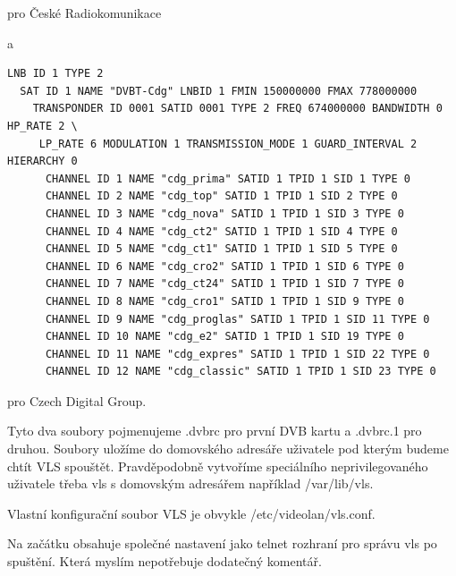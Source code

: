 \vspace{10pt}

pro České Radiokomunikace 

\vspace{10pt}

a

\vspace{10pt}

\begin{small}
\begin{verbatim}
LNB ID 1 TYPE 2
  SAT ID 1 NAME "DVBT-Cdg" LNBID 1 FMIN 150000000 FMAX 778000000
    TRANSPONDER ID 0001 SATID 0001 TYPE 2 FREQ 674000000 BANDWIDTH 0 HP_RATE 2 \
     LP_RATE 6 MODULATION 1 TRANSMISSION_MODE 1 GUARD_INTERVAL 2 HIERARCHY 0
      CHANNEL ID 1 NAME "cdg_prima" SATID 1 TPID 1 SID 1 TYPE 0
      CHANNEL ID 2 NAME "cdg_top" SATID 1 TPID 1 SID 2 TYPE 0
      CHANNEL ID 3 NAME "cdg_nova" SATID 1 TPID 1 SID 3 TYPE 0
      CHANNEL ID 4 NAME "cdg_ct2" SATID 1 TPID 1 SID 4 TYPE 0
      CHANNEL ID 5 NAME "cdg_ct1" SATID 1 TPID 1 SID 5 TYPE 0
      CHANNEL ID 6 NAME "cdg_cro2" SATID 1 TPID 1 SID 6 TYPE 0
      CHANNEL ID 7 NAME "cdg_ct24" SATID 1 TPID 1 SID 7 TYPE 0
      CHANNEL ID 8 NAME "cdg_cro1" SATID 1 TPID 1 SID 9 TYPE 0
      CHANNEL ID 9 NAME "cdg_proglas" SATID 1 TPID 1 SID 11 TYPE 0
      CHANNEL ID 10 NAME "cdg_e2" SATID 1 TPID 1 SID 19 TYPE 0
      CHANNEL ID 11 NAME "cdg_expres" SATID 1 TPID 1 SID 22 TYPE 0
      CHANNEL ID 12 NAME "cdg_classic" SATID 1 TPID 1 SID 23 TYPE 0
\end{verbatim}
\end{small}

\vspace{10pt}

pro Czech Digital Group.

\vspace{10pt}

Tyto dva soubory pojmenujeme .dvbrc pro první DVB kartu a .dvbrc.1 pro druhou. Soubory uložíme do domovského adresáře uživatele pod kterým budeme chtít VLS spouštět. Pravděpodobně vytvoříme speciálního neprivilegovaného uživatele třeba vls s domovským adresářem například /var/lib/vls.

\vspace{10pt}

Vlastní konfigurační soubor VLS je obvykle /etc/videolan/vls.conf. 

\vspace{10pt}

Na začátku obsahuje společné nastavení jako telnet rozhraní pro správu vls po spuštění. Která myslím nepotřebuje dodatečný komentář.

